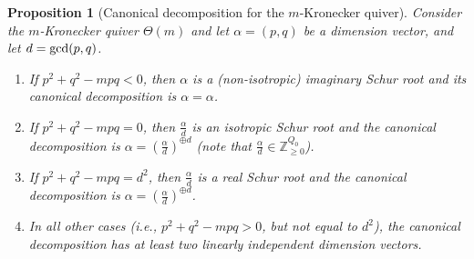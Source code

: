 \documentclass[11pt]{amsart}
\newtheorem{proposition}[theorem]{Proposition}
\theoremstyle{definition}
\newcommand{\Z}{{\mathbb Z}}
\begin{document}
\begin{proposition} [Canonical decomposition for the $m$-Kronecker quiver] \label{cd.kron}
Consider the $m$-Kronecker quiver $\Theta(m)$ and let $\alpha = (p,q)$ be a dimension vector, and let $d = {\rm gcd}(p,q)$.
\begin{enumerate}
\item If $p^2 + q^2 - mpq < 0$, then $\alpha$ is a (non-isotropic) imaginary Schur root and its canonical decomposition is $\alpha = \alpha$.
\item If $p^2 + q^2 - mpq = 0$, then $\frac{\alpha}{d}$ is an isotropic Schur root and the canonical decomposition is $\alpha = (\frac{\alpha}{d})^{\oplus d}$ (note that $\frac{\alpha}{d} \in \Z_{\geq 0}^{Q_0}$).
\item If $p^2 + q^2 - mpq = d^2$, then $\frac{\alpha}{d}$ is a real Schur root and the canonical decomposition is $\alpha = (\frac{\alpha}{d})^{\oplus d}$.
\item In all other cases (i.e., $p^2 + q^2 - mpq > 0$, but not equal to $d^2$), the canonical decomposition has at least two linearly independent dimension vectors.
\end{enumerate}

\end{proposition}
\end{document}
